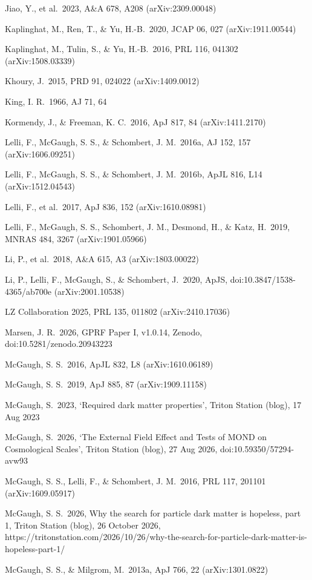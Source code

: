 \documentclass[
  10pt,
]{article}
\begin{document}
{\begin{list}{}{\setlength{\leftmargin}{1.5em}\setlength{\itemindent}{-1.5em}\setlength{\itemsep}{1pt}\setlength{\parsep}{0pt}}
\item Jiao, Y., et al.\ 2023, A\&A 678, A208 (arXiv:2309.00048)
\item Kaplinghat, M., Ren, T., \& Yu, H.-B.\ 2020, JCAP 06, 027 (arXiv:1911.00544)
\item Kaplinghat, M., Tulin, S., \& Yu, H.-B.\ 2016, PRL 116, 041302 (arXiv:1508.03339)
\item Khoury, J.\ 2015, PRD 91, 024022 (arXiv:1409.0012)
\item King, I. R.\ 1966, AJ 71, 64
\item Kormendy, J., \& Freeman, K. C.\ 2016, ApJ 817, 84 (arXiv:1411.2170)
\item Lelli, F., McGaugh, S. S., \& Schombert, J. M.\ 2016a, AJ 152, 157 (arXiv:1606.09251)
\item Lelli, F., McGaugh, S. S., \& Schombert, J. M.\ 2016b, ApJL 816, L14 (arXiv:1512.04543)
\item Lelli, F., et al.\ 2017, ApJ 836, 152 (arXiv:1610.08981)
\item Lelli, F., McGaugh, S. S., Schombert, J. M., Desmond, H., \& Katz, H.\ 2019, MNRAS 484, 3267 (arXiv:1901.05966)
\item Li, P., et al.\ 2018, A\&A 615, A3 (arXiv:1803.00022)
\item Li, P., Lelli, F., McGaugh, S., \& Schombert, J.\ 2020, ApJS, doi:10.3847/1538-4365/ab700e (arXiv:2001.10538)
\item LZ Collaboration 2025, PRL 135, 011802 (arXiv:2410.17036)
\item Marsen, J. R.\ 2026, GPRF Paper I, v1.0.14, Zenodo, doi:10.5281/zenodo.20943223
\item McGaugh, S. S.\ 2016, ApJL 832, L8 (arXiv:1610.06189)
\item McGaugh, S. S.\ 2019, ApJ 885, 87 (arXiv:1909.11158)
\item McGaugh, S.\ 2023, `Required dark matter properties', Triton Station (blog), 17 Aug 2023
\item McGaugh, S.\ 2026, `The External Field Effect and Tests of MOND on Cosmological Scales', Triton Station (blog), 27 Aug 2026, doi:10.59350/57294-avw93
\item McGaugh, S. S., Lelli, F., \& Schombert, J. M.\ 2016, PRL 117, 201101 (arXiv:1609.05917)
\item McGaugh, S. S.\ 2026, Why the search for particle dark matter is hopeless, part 1, Triton Station (blog), 26 October 2026, https://tritonstation.com/2026/10/26/why-the-search-for-particle-dark-matter-is-hopeless-part-1/
\item McGaugh, S. S., \& Milgrom, M.\ 2013a, ApJ 766, 22 (arXiv:1301.0822)

\end{list}}
\end{document}
